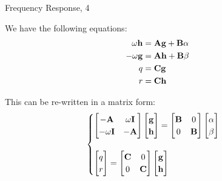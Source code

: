 \documentclass{beamer}
\begin{document}
\begin{frame}{Frequency Response, 4}
	\begin{flushleft}
		
		We have the following equations:
		\begin{align}
			\omega \mathbf{h} &= \mathbf{A} \mathbf{g} + \mathbf{B} \alpha
		\\
			-\omega \mathbf{g} &= \mathbf{A} \mathbf{h} + \mathbf{B} \beta
		\\
		q &= \mathbf{C} \mathbf{g}
		\\
		r &= \mathbf{C} \mathbf{h}
		\end{align}
		
		This can be re-written in a matrix form:
		\begin{align}
			\begin{cases}
				\begin{bmatrix}
					-\mathbf{A} & \omega \mathbf{I} \\
					-\omega \mathbf{I} & -\mathbf{A}
				\end{bmatrix}
				\begin{bmatrix}
					\mathbf{g} \\ \mathbf{h}
				\end{bmatrix}
				=
				\begin{bmatrix}
					\mathbf{B} & 0 \\  0 & \mathbf{B}
				\end{bmatrix}
				\begin{bmatrix}
					\alpha \\   \beta
				\end{bmatrix}
				\\
				\\
				\begin{bmatrix}
					q \\  r
				\end{bmatrix}
				= 
				\begin{bmatrix}
					\mathbf{C} & 0 \\  0 & \mathbf{C}
				\end{bmatrix}
				\begin{bmatrix}
					\mathbf{g} \\ \mathbf{h}
				\end{bmatrix}
			\end{cases}
		\end{align}		
		
		
	\end{flushleft}
\end{frame}
\end{document}
